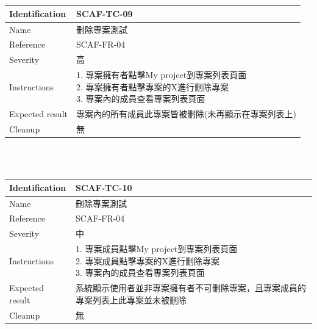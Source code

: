 \documentclass{report}
\begin{document}
\\
\newline
\\
\begin{tabularx}{\textwidth}{
  |p{}%
  |p{}|%
  }
  \hline
  \centering Identification &  SCAF-TC-09 \\
  \hline
  \centering Name & 刪除專案測試 \\
  \hline
  \centering Reference & SCAF-FR-04 \\
  \hline
  \centering Severity & 高 \\
  \hline
  \centering Instructions & 
  \makecell[l]{
    1. 專案擁有者點擊My project到專案列表頁面 \\
    2. 專案擁有者點擊專案的X進行刪除專案 \\
    3. 專案內的成員查看專案列表頁面 
  }\\
  \hline
  \centering Expected result & 專案內的所有成員此專案皆被刪除(未再顯示在專案列表上) \\
  \hline
  \centering Cleanup & 無 \\
  \hline
\end{tabularx}
\\
\newline
\\
\begin{tabularx}{\textwidth}{
  |p{}%
  |p{}|%
  }
  \hline
  \centering Identification &  SCAF-TC-10 \\
  \hline
  \centering Name & 刪除專案測試 \\
  \hline
  \centering Reference & SCAF-FR-04 \\
  \hline
  \centering Severity & 中 \\
  \hline
  \centering Instructions & 
  \makecell[l]{
    1. 專案成員點擊My project到專案列表頁面 \\
    2. 專案成員點擊專案的X進行刪除專案 \\
    3. 專案內的成員查看專案列表頁面  
  }\\
  \hline
  \centering Expected result & 系統顯示使用者並非專案擁有者不可刪除專案，且專案成員的專案列表上此專案並未被刪除 \\
  \hline
  \centering Cleanup & 無 \\
  \hline
\end{tabularx}
\\
\end{document}
